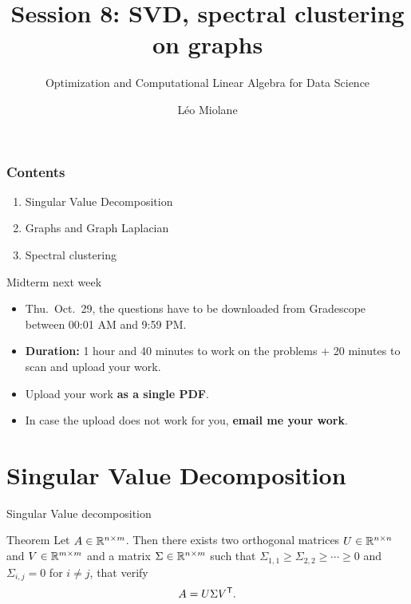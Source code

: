 \documentclass{beamer}
\title{Session 8: SVD, spectral clustering on graphs}
\subtitle{Optimization and Computational Linear Algebra for Data Science}
\author{Léo Miolane}
\date{}
\begin{document}
\setcounter{showProgressBar}{0}
\setcounter{showSlideNumbers}{0}

\frame{\titlepage}

\begin{frame}
	\frametitle{Contents}
	\begin{enumerate}
		\item Singular Value Decomposition
		\item Graphs and Graph Laplacian
		\item Spectral clustering
	\end{enumerate}
\end{frame}

\begin{frame}{Midterm next week}
	\begin{itemize}
		\item Thu.\ Oct.\ 29, the questions have to be downloaded from Gradescope between 00:01 AM and 9:59 PM.
			\vspace{2mm}
		\item \textbf{Duration:} 1 hour and 40 minutes to work on the problems + 20 minutes to scan and upload your work.
			\vspace{2mm}
		\item Upload your work \textbf{as a single PDF}.
			\vspace{2mm}
		\item In case the upload does not work for you, \textbf{email me your work}.
	\end{itemize}
\end{frame}

\setcounter{framenumber}{0}
\setcounter{showSlideNumbers}{1}


\section{Singular Value Decomposition}


\begin{frame}[t]{Singular Value decomposition}
	\grid

	\vspace{-0.3cm}
	\begin{block}{Theorem}
		Let $A \in \mathbb{R}^{n \times m}$. Then there exists two orthogonal matrices $U \in \mathbb{R}^{n \times n}$ and $V \in \mathbb{R}^{m \times m}$ and a matrix $\Sigma \in \mathbb{R}^{n \times m}$ such that $\Sigma_{1,1} \geq \Sigma_{2,2}  \geq \cdots \geq 0$ and $\Sigma_{i,j} = 0$ for $i\neq j$, that verify
		$$
		A = U \Sigma V^{{\sf T}}.
		$$
	\end{block}
\end{frame}
\end{document}
